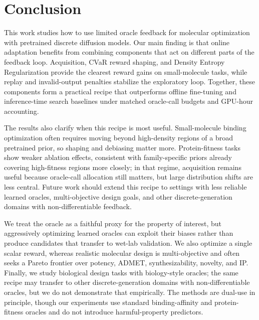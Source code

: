 \documentclass{article}
\begin{document}
\section{Conclusion}
This work studies how to use limited oracle feedback for molecular optimization with pretrained discrete diffusion models. Our main finding is that online adaptation benefits from combining components that act on different parts of the feedback loop. Acquisition, CVaR reward shaping, and Density Entropy Regularization provide the clearest reward gains on small-molecule tasks, while replay and invalid-output penalties stabilize the exploratory loop. Together, these components form a practical recipe that outperforms offline fine-tuning and inference-time search baselines under matched oracle-call budgets and GPU-hour accounting.

The results also clarify when this recipe is most useful. Small-molecule binding optimization often requires moving beyond high-density regions of a broad pretrained prior, so shaping and debiasing matter more. Protein-fitness tasks show weaker ablation effects, consistent with family-specific priors already covering high-fitness regions more closely; in that regime, acquisition remains useful because oracle-call allocation still matters, but large distribution shifts are less central. Future work should extend this recipe to settings with less reliable learned oracles, multi-objective design goals, and other discrete-generation domains with non-differentiable feedback. %

We treat the oracle as a faithful proxy for the property of interest, but aggressively optimizing learned oracles can exploit their biases rather than produce candidates that transfer to wet-lab validation. We also optimize a single scalar reward, whereas realistic molecular design is multi-objective and often seeks a Pareto frontier over potency, ADMET, synthesizability, novelty, and IP. Finally, we study biological design tasks with biology-style oracles; the same recipe may transfer to other discrete-generation domains with non-differentiable oracles, but we do not demonstrate that empirically. The methods are dual-use in principle, though our experiments use standard binding-affinity and protein-fitness oracles and do not introduce harmful-property predictors.
\end{document}
